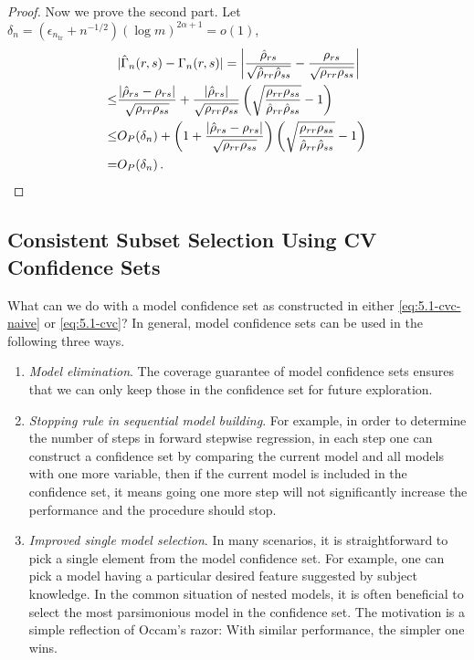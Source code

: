 \documentclass[11pt]{article}
\theoremstyle{plain}
\newcommand{\tr}{{\mathrm{tr}}}
\begin{document}
\begin{proof}
Now we prove the second part. Let $\delta_n= (\epsilon_{n_\tr}+n^{-1/2})(\log m)^{2\alpha+1}=o(1)$,
\begin{align*}
     &|\hat\Gamma_{n}(r,s)-\Gamma_{n}(r,s)|=\left|\frac{\hat\rho_{rs}}{\sqrt{\hat\rho_{rr}\hat\rho_{ss}}}-\frac{\rho_{rs}}{\sqrt{\rho_{rr}\rho_{ss}}}\right|\\
    \le & \frac{|\hat\rho_{rs}-\rho_{rs}|}{\sqrt{\rho_{rr}\rho_{ss}}} + \frac{|\hat\rho_{rs}|}{\sqrt{\rho_{rr}\rho_{ss}}}\left(\sqrt{\frac{\rho_{rr}\rho_{ss}}{\hat\rho_{rr}\hat\rho_{ss}}}-1\right)\\
    \le & O_P(\delta_n) + \left(1+\frac{|\hat\rho_{rs}-\rho_{rs}|}{\sqrt{\rho_{rr}\rho_{ss}}}\right)\left(\sqrt{\frac{\rho_{rr}\rho_{ss}}{\hat\rho_{rr}\hat\rho_{ss}}}-1\right)\\
     = & O_P(\delta_n)\,.\qedhere
\end{align*}
\end{proof}
\subsection{Consistent Subset Selection Using CV Confidence Sets}\label{subsec:5.2-cvc-consist}
What can we do with a model confidence set as constructed in either \eqref{eq:5.1-cvc-naive} or \eqref{eq:5.1-cvc}?  In general, model confidence sets can be used in the following three ways.
\begin{enumerate}
    \item \emph{Model elimination}.  The coverage guarantee of model confidence sets ensures that we can only keep those in the confidence set for future exploration.
    \item \emph{Stopping rule in sequential model building}.  For example, in order to determine the number of steps in forward stepwise regression, in each step one can construct a confidence set by comparing the current model and all models with one more variable, then if the current model is included in the confidence set, it means going one more step will not significantly increase the performance and the procedure should stop.
    \item \emph{Improved single model selection}.  In many scenarios, it is straightforward to pick a single element from the model confidence set.  For example, one can pick a model having a particular desired feature suggested by subject knowledge.  In the common situation of nested models, it is often beneficial to select the most parsimonious model in the confidence set.  The motivation is a simple reflection of Occam's razor: With similar performance, the simpler one wins.
\end{enumerate}
\end{document}
